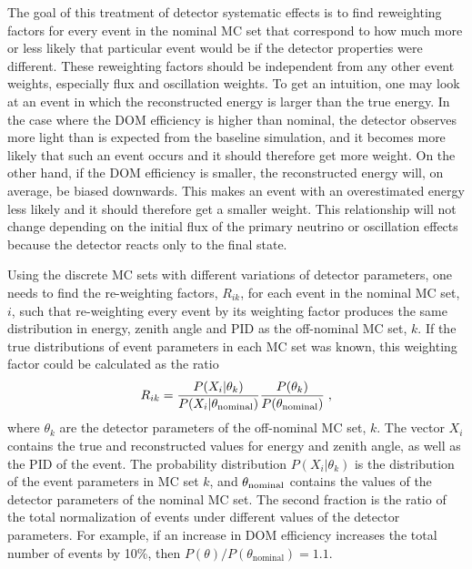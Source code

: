 The goal of this treatment of detector systematic effects is to find reweighting factors for every event in the nominal MC set that correspond to how much more or less likely that particular event would be if the detector properties were different.
These reweighting factors should be independent from any other event weights, especially flux and oscillation weights.
To get an intuition, one may look at an event in which the reconstructed energy is larger than the true energy.
In the case where the DOM efficiency is higher than nominal, the detector observes more light than is expected from the baseline simulation, and it becomes more likely that such an event occurs and it should therefore get more weight.
On the other hand, if the DOM efficiency is smaller, the reconstructed energy will, on average, be biased downwards.
This makes an event with an overestimated energy less likely and it should therefore get a smaller weight.
This relationship will not change depending on the initial flux of the primary neutrino or oscillation effects because the detector reacts only to the final state.

Using the discrete MC sets with different variations of detector parameters, one needs to find the re-weighting factors, $R_{ik}$, for each event in the nominal MC set, $i$, such that re-weighting every event by its weighting factor produces the same distribution in energy, zenith angle and PID as the off-nominal MC set, $k$.
If the true distributions of event parameters in each MC set was known, this weighting factor could be calculated as the ratio
\begin{equation}
    R_{ik} = \frac{P(X_i|\theta_k)}{P(X_i|\theta_{\rm nominal})} \frac{P(\theta_k)}{P(\theta_{\rm nominal})}\;, \label{eq:ratio-likelihood}
\end{equation}
where $\theta_k$ are the detector parameters of the off-nominal MC set, $k$.
The vector $X_i$ contains the true and reconstructed values for energy and zenith angle, as well as the PID of the event.
 The probability distribution $P(X_i|\theta_k)$ is the distribution of the event parameters in MC set $k$, and $\theta_{\rm nominal}$ contains the values of the detector parameters of the nominal MC set.
The second fraction is the ratio of the total normalization of events under different values of the detector parameters.
For example, if an increase in DOM efficiency increases the total number of events by 10\%, then $P(\theta) / P(\theta_\mathrm{nominal}) = 1.1$.

